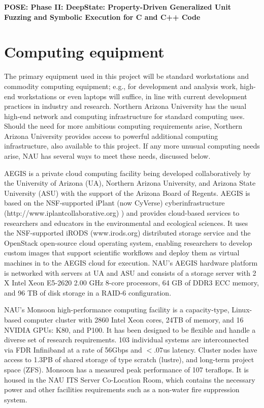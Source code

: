 \documentclass[12pt]{article}
\begin{document}
\begin{center}
{\Large\sf\textbf{POSE: Phase II: DeepState: Property-Driven Generalized Unit Fuzzing and Symbolic Execution for C and C++ Code}}
\end{center}

\section*{Computing equipment}

The primary equipment used in this project will be standard workstations and commodity computing equipment; e.g., for development and analysis work, high-end workstations or even laptops will suffice, in line with current development practices in industry and research. Northern Arizona University has the usual high-end network and computing infrastructure for standard computing uses.  Should the need for more ambitious computing requirements arise, Northern Arizona University provides access to powerful additional computing infrastructure, also available to this project.   If any more unusual computing needs arise, NAU has several ways to meet these needs, discussed below.

AEGIS is a private cloud computing facility being developed collaboratively by the University of Arizona (UA), Northern Arizona University, and Arizona State University (ASU) with the support of the Arizona Board of Regents. AEGIS is based on the NSF-supported iPlant (now CyVerse) cyberinfrastructure (http://www.iplantcollaborative.org) ) and provides cloud-based services to researchers and educators in the environmental and ecological sciences. It uses the NSF-supported iRODS (www.irods.org) distributed storage service and the OpenStack open-source cloud operating system, enabling researchers to develop custom images that support scientific workflows and deploy them as virtual machines in to the AEGIS cloud for execution. NAU’s AEGIS hardware platform is networked with servers at UA and ASU and consists of a storage server with 2 X Intel Xeon E5-2620 2.00 GHz 8-core processors, 64 GB of DDR3 ECC memory, and 96 TB of disk storage in a RAID-6 configuration.

NAU’s Monsoon high-performance computing facility is a capacity-type, Linux-based computer cluster with 2860 Intel Xeon cores, 24TB of memory, and 16 NVIDIA GPUs: K80, and P100. It has been designed to be flexible and handle a diverse set of research requirements. 103 individual systems are interconnected via FDR Infiniband at a rate of 56Gbps and $<.07$us latency. Cluster nodes have access to 1.3PB of shared storage of type scratch (lustre), and long-term project space (ZFS). Monsoon has a measured peak performance of 107 teraflops. It is housed in the NAU ITS Server Co-Location Room, which contains the necessary power and other facilities requirements such as a non-water fire suppression system.
\end{document}
